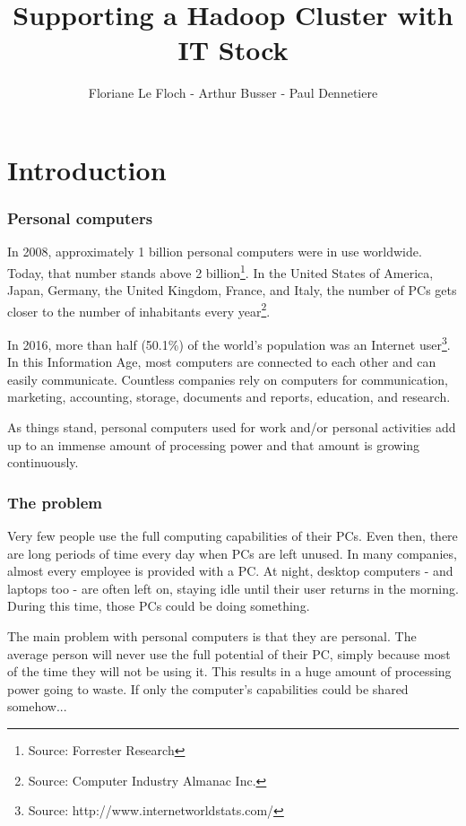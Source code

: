 \documentclass[11pt]{report} %
\title{Supporting a Hadoop Cluster with IT Stock}
\author{Floriane Le Floch - Arthur Busser - Paul Dennetiere}
\begin{document}
\maketitle
\renewcommand{\contentsname}{Summary}
\newpage
\tableofcontents
\newpage

\part{Introduction}

\section{Personal computers}
In 2008, approximately 1 billion personal computers were in use worldwide. Today, that number stands above 2 billion\footnote{Source: Forrester Research}. In the United States of America, Japan, Germany, the United Kingdom, France, and Italy, the number of PCs gets closer to the number of inhabitants every year\footnote{Source: Computer Industry Almanac Inc.}.

In 2016, more than half (50.1\%) of the world's population was an Internet user\footnote{Source: http://www.internetworldstats.com/}. In this Information Age, most computers are connected to each other and can easily communicate. Countless companies rely on computers for communication, marketing, accounting, storage, documents and reports, education, and research.

As things stand, personal computers used for work and/or personal activities add up to an immense amount of processing power and that amount is growing continuously.

\section{The problem}
Very few people use the full computing capabilities of their PCs. Even then, there are long periods of time every day when PCs are left unused. In many companies, almost every employee is provided with a PC. At night, desktop computers - and laptops too - are often left on, staying idle until their user returns in the morning. During this time, those PCs could be doing something.

The main problem with personal computers is that they are personal. The average person will never use the full potential of their PC, simply because most of the time they will not be using it. This results in a huge amount of processing power going to waste. If only the computer's capabilities could be shared somehow...
  
\end{document}
